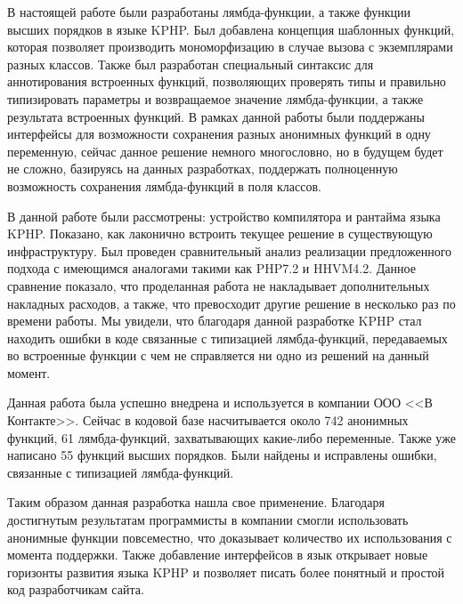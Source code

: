 
\startconclusionpage
В настоящей работе были разработаны лямбда-функции, а также функции высших порядков в языке KPHP.
Был добавлена концепция шаблонных функций, которая позволяет производить мономорфизацию в случае вызова с экземплярами разных классов.
Также был разработан специальный синтаксис для аннотирования встроенных функций, позволяющих проверять типы и правильно типизировать параметры и возвращаемое значение лямбда-функции, а также результата встроенных функций.
В рамках данной работы были поддержаны интерфейсы для возможности сохранения разных анонимных функций в одну переменную, сейчас данное решение немного многословно, но в будущем будет не сложно, базируясь на данных разработках, поддержать полноценную возможность сохранения лямбда-функций в поля классов.

В данной работе были рассмотрены: устройство компилятора и рантайма языка KPHP.
Показано, как лаконично встроить текущее решение в существующую инфраструктуру.
Был проведен сравнительный анализ реализации предложенного подхода с имеющимся аналогами такими как PHP7.2 и HHVM4.2.
Данное сравнение показало, что проделанная работа не накладывает дополнительных накладных расходов, а также, что превосходит другие решение в несколько раз по времени работы.
Мы увидели, что благодаря данной разработке KPHP стал находить ошибки в коде связанные с типизацией лямбда-функций, передаваемых во встроенные функции с чем не справляется ни одно из решений на данный момент.

Данная работа была успешно внедрена и используется в компании ООО <<В Контакте>>.
Сейчас в кодовой базе насчитывается около 742 анонимных функций, 61 лямбда-функций, захватывающих какие-либо переменные.
Также уже написано 55 функций высших порядков.
Были найдены и исправлены ошибки, связанные с типизацией лямбда-функций.

Таким образом данная разработка нашла свое применение.
Благодаря достигнутым результатам программисты в компании смогли использовать анонимные функции повсеместно, что доказывает количество их использования с момента поддержки.
Также добавление интерфейсов в язык открывает новые горизонты развития языка KPHP и позволяет писать более понятный и простой код разработчикам сайта.

\printmainbibliography
